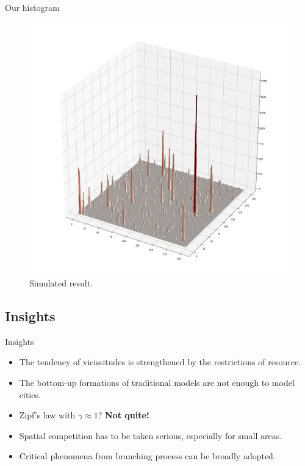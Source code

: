 \begin{frame}{Our histogram}
    \begin{figure}
        \centering
        \includegraphics[width = 0.7\linewidth]{Pics/3dhist.jpeg}
        \caption{Simulated result.}
        \label{fig:my3dhist}
    \end{figure}
\end{frame}
\subsection{Insights}
\begin{frame}{Insights}
    \begin{itemize}
        \item The tendency of vicissitudes is strengthened by the restrictions of resource. \item The bottom-up formations of traditional models are not enough to model cities.
        \item Zipf's law with $\gamma \approx 1$?
            \textbf{Not quite!}
        \item Spatial competition has to be taken serious, especially for small areas. 
        \item Critical phenomena from branching process can be broadly adopted.
    \end{itemize}
\end{frame}